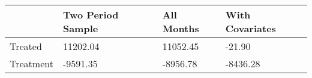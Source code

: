 \begin{tabular}{llll}
\toprule
 & Two Period Sample & All Months & With Covariates \\
\midrule
Treated & 11202.04 & 11052.45 & -21.90 \\
Treatment & -9591.35 & -8956.78 & -8436.28 \\
\bottomrule
\end{tabular}
